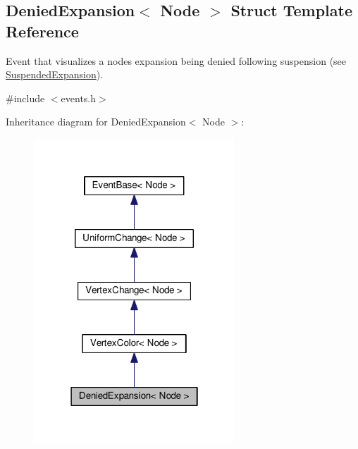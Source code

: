 \hypertarget{structDeniedExpansion}{}\subsection{Denied\+Expansion$<$ Node $>$ Struct Template Reference}
\label{structDeniedExpansion}


Event that visualizes a node\textquotesingle{}s expansion being denied following suspension (see \hyperlink{structSuspendedExpansion}{Suspended\+Expansion}).  




{\ttfamily \#include $<$events.\+h$>$}



Inheritance diagram for Denied\+Expansion$<$ Node $>$\+:\nopagebreak
\begin{figure}[H]
\begin{center}
\leavevmode
\includegraphics[width=214pt]{structDeniedExpansion__inherit__graph}
\end{center}
\end{figure}


